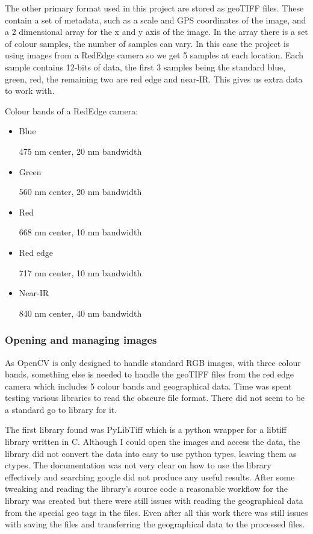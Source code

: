 The other primary format used in this project are stored as geoTIFF files. These contain a set of metadata, such as a scale and GPS coordinates of the image, and a 2 dimensional array for the x and y axis of the image. In the array there is a set of colour samples, the number of samples can vary. In this case the project is using images from a RedEdge camera so we get 5 samples at each location. Each sample contains 12-bits of data, the first 3 samples being the standard blue, green, red, the remaining two are red edge and near-IR. This gives us extra data to work with.


Colour bands of a RedEdge camera:

\begin{itemize}
    \item Blue 
    
    475 nm center, 20 nm bandwidth
    
    \item Green 
    
    560 nm center, 20 nm bandwidth
    
    \item Red 
    
    668 nm center, 10 nm bandwidth
    
    \item Red edge
    
    717 nm center, 10 nm bandwidth
    
    \item Near-IR
    
    840 nm center, 40 nm bandwidth\cite{rededge}
\end{itemize}

\subsubsection{Opening and managing images}

As OpenCV is only designed to handle standard RGB images, with three colour bands, something else is needed to handle the geoTIFF files from the red edge camera which includes 5 colour bands and geographical data. Time was spent testing various libraries to read the obscure file format. There did not seem to be a standard go to library for it. 

The first library found was PyLibTiff \cite{pylibtiff} which is a python wrapper for a libtiff library written in C. Although I could open the images and access the data, the library did not convert the data into easy to use python types, leaving them as ctypes. The documentation was not very clear on how to use the library effectively and searching google did not produce any useful results. After some tweaking and reading the library's source code a reasonable workflow for the library was created but there were still issues with reading the geographical data from the special geo tags in the files. Even after all this work there was still issues with saving the files and transferring the geographical data to the processed files.

